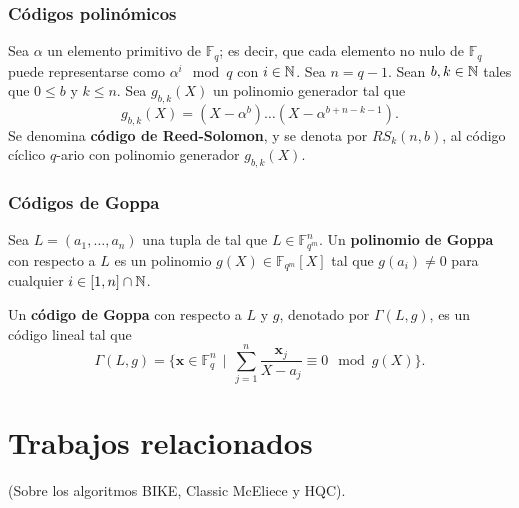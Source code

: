 \subsubsection{Códigos polinómicos}

\begin{definition}
	Sea $\alpha$ un elemento primitivo de $\mathbb{F}_q$; es decir, que cada elemento no nulo de $\mathbb{F}_q$ puede representarse como $\alpha^i \mod q$ con $i \in \mathbb{N}$. Sea $n = q - 1$. Sean $b, k \in \mathbb{N}$ tales que $0 \leq b$ y $k \leq n$. Sea $g_{b,k}(X)$ un polinomio generador tal que
	\[g_{b,k}(X) = (X - \alpha^b)\hdots(X - \alpha^{b+n-k-1}).\]
	Se denomina \textbf{código de Reed-Solomon}, y se denota por $RS_k(n, b)$, al código cíclico $q$-ario con polinomio generador $g_{b,k}(X)$.
\end{definition}

\subsubsection{Códigos de Goppa}

\begin{definition}
	Sea $L = (a_1, \dots, a_n)$ una tupla de tal que $L \in \mathbb{F}_{q^m}^n$. Un \textbf{polinomio de Goppa} con respecto a $L$ es un polinomio $g(X) \in \mathbb{F}_{q^m}[X]$ tal que $g(a_i) \neq 0$ para cualquier $i \in [1, n] \cap \mathbb{N}$.
\end{definition}

\begin{definition}
	Un \textbf{código de Goppa} con respecto a $L$ y $g$, denotado por $\Gamma(L, g)$, es un código lineal tal que
	\[\Gamma(L, g) = \bigg\{\textbf{x} \in \mathbb{F}_q^n \ \ \bigg|\ \ \sum_{j=1}^n \frac{\textbf{x}_j}{X - a_j} \equiv 0 \mod g(X)\bigg\}.\]
\end{definition}

\section{Trabajos relacionados}

(Sobre los algoritmos BIKE, Classic McEliece y HQC).
